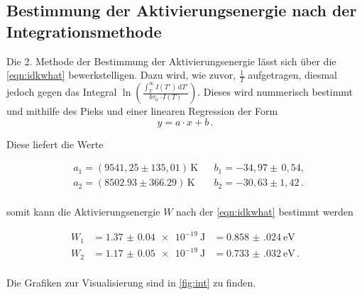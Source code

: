\subsection{Bestimmung der Aktivierungsenergie nach der Integrationsmethode}

Die 2. Methode der Bestimmung der Aktivierungsenergie lässt sich über die \autoref{eqn:idkwhat} bewerkstelligen. Dazu wird, wie zuvor, $\frac{1}{T}$ aufgetragen, diesmal jedoch gegen
das Integral $\ln\left( \frac{\int_T^\infty I(T') \, \text{d}T'}{b \tau_0 \cdot I(T)}\right)$. Dieses wird nummerisch bestimmt und mithilfe des Pieks und einer linearen Regression 
der Form 
\begin{equation*}
  y = a \cdot x + b \, .
\end{equation*}

\noindent
Diese liefert die Werte 

\begin{align*}
  &a_1 = (9541,25 \pm 135,01)\,\si{\kelvin}  && b_1 = -34,97 \pm  \, 0,54 , \\ 
  &a_2 = (8502.93 \pm 366.29)\,\si{\kelvin} && b_2 = -30,63 \pm 1,42\, . \\ 
\end{align*}

\noindent
somit kann die Aktivierungsenergie $W$ nach der \autoref{eqn:idkwhat} bestimmt werden

\begin{align*}
  W_{1} &= \SI{1.37(4)e-19}{\joule} &= \SI{0.858(024)}{\electronvolt} \, \\
  W_{2} &= \SI{1.17(5)e-19}{\joule} &= \SI{0.733(032)}{\electronvolt} \, .\\
\end{align*}

\noindent
Die Grafiken zur Visualisierung sind in \autoref{fig:int} zu finden.

